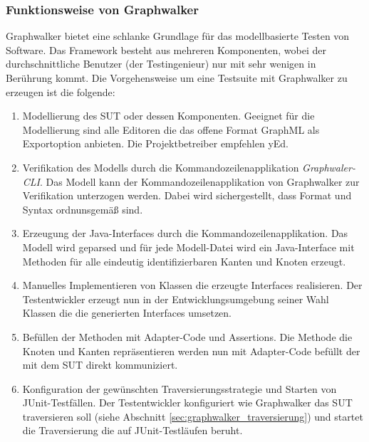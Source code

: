 \subsubsection{Funktionsweise von Graphwalker}
\label{sec:graphwalker_funktionsweise}
Graphwalker bietet eine schlanke Grundlage für das modellbasierte Testen von Software. Das Framework besteht aus mehreren Komponenten, wobei der durchschnittliche Benutzer (der Testingenieur) nur mit sehr wenigen in Berührung kommt. Die Vorgehensweise um eine Testsuite mit Graphwalker zu erzeugen ist die folgende:

\begin{enumerate}
\item Modellierung des SUT oder dessen Komponenten. Geeignet für die Modellierung sind alle Editoren die das offene Format GraphML als Exportoption anbieten. Die Projektbetreiber empfehlen yEd.
\item Verifikation des Modells durch die Kommandozeilenapplikation \textit{Graphwaler-CLI}. Das Modell kann der Kommandozeilenapplikation von Graphwalker zur Verifikation unterzogen werden. Dabei wird sichergestellt, dass Format und Syntax ordnunsgemäß sind.
\item Erzeugung der Java-Interfaces durch die Kommandozeilenapplikation. Das Modell wird geparsed und für jede Modell-Datei wird ein Java-Interface mit Methoden für alle eindeutig identifizierbaren Kanten und Knoten erzeugt.
\item Manuelles Implementieren von Klassen die erzeugte Interfaces realisieren. Der Testentwickler erzeugt nun in der Entwicklungsumgebung seiner Wahl Klassen die die generierten Interfaces umsetzen.
\item Befüllen der Methoden mit Adapter-Code und Assertions. Die Methode die Knoten und Kanten repräsentieren werden nun mit Adapter-Code befüllt der mit dem SUT direkt kommuniziert.
\item Konfiguration der gewünschten Traversierungsstrategie und Starten von JUnit-Testfällen. Der Testentwickler konfiguriert wie Graphwalker das SUT traversieren soll (siehe Abschnitt \ref{sec:graphwalker_traversierung}) und startet die Traversierung die auf JUnit-Testläufen beruht.
\end{enumerate}


